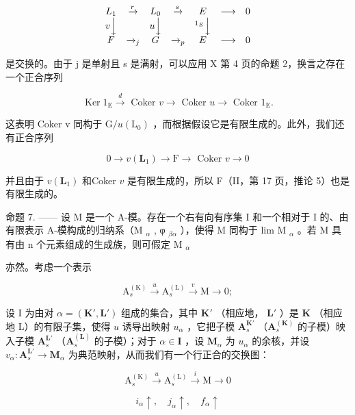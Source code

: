 \[
\begin{array}{c c c c c c c} L _ {1} & \xrightarrow {r} & L _ {0} & \xrightarrow {s} & E & \longrightarrow & 0 \\ v \Big \downarrow & & u \Big \downarrow & & ^ {1 _ {E}} \Big \downarrow \\ F & \xrightarrow {} _ {j} & G & \xrightarrow {} _ {p} & E & \longrightarrow & 0 \end{array}
\]

是交换的。由于 j 是单射且 s 是满射，可以应用 X 第 4 页的命题 2，换言之存在一个正合序列

\[
\operatorname{Ker} 1 _ {\mathrm{E}} \xrightarrow {d} \text { Coker } v \longrightarrow \text { Coker } u \longrightarrow \text { Coker } 1 _ {\mathrm{E}}.
\]

这表明 Coker v 同构于 \(\mathrm{G}/u(\mathrm{L}_{0})\) ，而根据假设它是有限生成的。此外，我们还有正合序列

\[
0 \rightarrow v (\mathbf {L} _ {1}) \rightarrow \mathrm{F} \rightarrow \text { Coker } v \rightarrow 0
\]

并且由于 \(v(\mathbf{L}_1)\) 和Coker \(v\) 是有限生成的，所以 F（II，第 17 页，推论 5）也是有限生成的。

命题 7. —— 设 M 是一个 A-模。存在一个右有向有序集 I 和一个相对于 I 的、由有限表示 A-模构成的归纳系（M \(_{\alpha}\) , φ \(_{\beta\alpha}\) ），使得 M 同构于 lim M \(_{\alpha}\) 。若 M 具有由 n 个元素组成的生成族，则可假定 M \(_{\alpha}\)

亦然。考虑一个表示

\[
\mathrm{A} _ {s} ^ {(\mathrm{K})} \xrightarrow {u} \mathrm{A} _ {s} ^ {(\mathrm{L})} \xrightarrow {v} \mathrm{M} \longrightarrow 0;
\]

设 I 为由对 \(\alpha = (\mathbf{K}', \mathbf{L}')\) 组成的集合，其中 \(\mathbf{K}'\) （相应地， \(\mathbf{L}'\) ）是 \(\mathbf{K}\) （相应地 L）的有限子集，使得 \(u\) 诱导出映射 \(u_{\alpha}\) ，它把子模 \(\mathbf{A}_s^{\mathbf{K}'}\) （\(\mathbf{A}_s^{(\mathbf{K})}\) 的子模）映入子模 \(\mathbf{A}_s^{\mathbf{L}'}\) （\(\mathbf{A}_s^{(\mathbf{L})}\) 的子模）；对于 \(\alpha \in \mathbf{I}\) ，设 \(\mathbf{M}_{\alpha}\) 为 \(u_{\alpha}\) 的余核，并设 \(v_{\alpha}: \mathbf{A}_s^{\mathbf{L}'} \to \mathbf{M}_{\alpha}\) 为典范映射，从而我们有一个行正合的交换图：

\[
\mathrm{A} _ {s} ^ {(\mathrm{K})} \xrightarrow {u} \mathrm{A} _ {s} ^ {(\mathrm{L})} \xrightarrow {i} \mathrm{M} \longrightarrow 0
\]

\[
i _ {\alpha} \uparrow , \quad j _ {\alpha} \uparrow , \quad f _ {\alpha} \uparrow
\]

